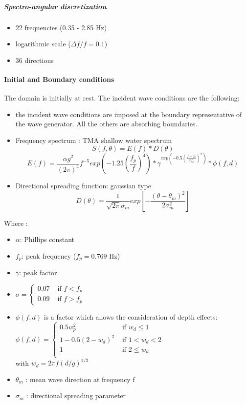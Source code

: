 \subparagraph{Spectro-angular discretization}
\begin{itemize}
\item 22 frequencies (0.35 - 2.85 Hz)
\item logarithmic scale ($\Delta f/f = 0.1$)
\item 36 directions
\end{itemize}

\paragraph{Initial and Boundary conditions}
The domain is initially at rest.
The incident wave conditions are the following:
\begin{itemize}
\item the incident wave conditions are imposed at the boundary representative of the wave generator. All the others are absorbing boundaries.
\item Frequency spectrum : TMA shallow water spectrum
\[S(f,\theta) = E(f)*D(\theta) \]
\[E(f) = \frac{\alpha g^2}{(2\pi)^4}f^{-5} exp(-1.25(\frac{f_p}{f})^{4})*\gamma^{exp(-0.5(\frac{f-f_p}{\sigma f_p})^{2})}*\phi (f,d)
\]
\item Directional spreading function: gaussian type
\[D(\theta) = \frac{1}{\sqrt{2\pi}\sigma _m}exp[-\frac{(\theta - \theta _m)^2}{2\sigma^2_m}]
\]
\end{itemize}
Where :\\
\begin{itemize}
\item $\alpha$: Phillips constant
\item $f_p$: peak frequency ($f_p = 0.769$ Hz)
\item $\gamma $: peak factor
\item $\sigma = \left\{ \begin{array}{rl}
 0.07 &\mbox{ if $f<f_p$} \\
  0.09 &\mbox{ if $f>f_p$}
       \end{array} \right.$
\item $\phi (f,d)$ is a factor which allows the consideration of depth effects:\\
$\phi (f,d) = \left\{ \begin{array}{rl}
 0.5 w^2_p &\mbox{ if $w_d\le 1$} \\
  1-0.5(2-w_d)^2 &\mbox{ if $1<w_d<2$}\\
  1 &\mbox{ if $2 \le w_d$} \\
       \end{array} \right.$\\
       with $w_d = 2\pi f(d/g)^{1/2}$
       \item$\theta _m$ : mean wave direction at frequency f
       \item $\sigma _m$ : directional spreading parameter
\end{itemize}
